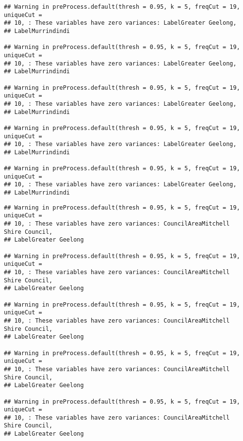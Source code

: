 \documentclass[
]{article}
\begin{document}
\begin{verbatim}
## Warning in preProcess.default(thresh = 0.95, k = 5, freqCut = 19, uniqueCut =
## 10, : These variables have zero variances: LabelGreater Geelong,
## LabelMurrindindi

## Warning in preProcess.default(thresh = 0.95, k = 5, freqCut = 19, uniqueCut =
## 10, : These variables have zero variances: LabelGreater Geelong,
## LabelMurrindindi

## Warning in preProcess.default(thresh = 0.95, k = 5, freqCut = 19, uniqueCut =
## 10, : These variables have zero variances: LabelGreater Geelong,
## LabelMurrindindi

## Warning in preProcess.default(thresh = 0.95, k = 5, freqCut = 19, uniqueCut =
## 10, : These variables have zero variances: LabelGreater Geelong,
## LabelMurrindindi

## Warning in preProcess.default(thresh = 0.95, k = 5, freqCut = 19, uniqueCut =
## 10, : These variables have zero variances: LabelGreater Geelong,
## LabelMurrindindi
\end{verbatim}

\begin{verbatim}
## Warning in preProcess.default(thresh = 0.95, k = 5, freqCut = 19, uniqueCut =
## 10, : These variables have zero variances: CouncilAreaMitchell Shire Council,
## LabelGreater Geelong

## Warning in preProcess.default(thresh = 0.95, k = 5, freqCut = 19, uniqueCut =
## 10, : These variables have zero variances: CouncilAreaMitchell Shire Council,
## LabelGreater Geelong

## Warning in preProcess.default(thresh = 0.95, k = 5, freqCut = 19, uniqueCut =
## 10, : These variables have zero variances: CouncilAreaMitchell Shire Council,
## LabelGreater Geelong

## Warning in preProcess.default(thresh = 0.95, k = 5, freqCut = 19, uniqueCut =
## 10, : These variables have zero variances: CouncilAreaMitchell Shire Council,
## LabelGreater Geelong

## Warning in preProcess.default(thresh = 0.95, k = 5, freqCut = 19, uniqueCut =
## 10, : These variables have zero variances: CouncilAreaMitchell Shire Council,
## LabelGreater Geelong
\end{verbatim}
\end{document}
